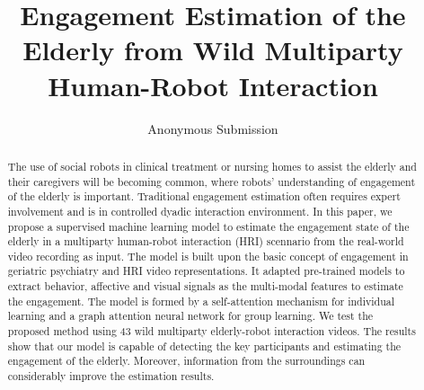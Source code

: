 \documentclass[twocolumn]{svjour3}
\begin{document}
\title{Engagement Estimation of the Elderly from Wild Multiparty Human-Robot Interaction}
\subtitle{}
\author{Anonymous Submission}
\date{}                                   %
\maketitle

\begin{abstract}
The use of social robots in clinical treatment or nursing homes to assist the elderly and their caregivers will be becoming common, where robots' understanding of engagement of the elderly is important. Traditional engagement estimation often requires expert involvement and is in controlled dyadic interaction environment. In this paper, we propose a supervised machine learning model to estimate the engagement state of the elderly in a multiparty human-robot interaction (HRI) scennario from the real-world video recording as input. The model is built upon the basic concept of engagement in geriatric psychiatry and HRI video representations. It adapted pre-trained models to extract behavior, affective and visual signals as the multi-modal features to estimate the engagement. The model is formed by a self-attention mechanism for individual learning and a graph attention neural network for group learning.  
We test the proposed method using 43 wild multiparty elderly-robot interaction videos.  The results show that our model is capable of detecting the key participants and estimating the engagement of the elderly. Moreover, information from the surroundings can considerably improve the estimation results.
\end{abstract}
\end{document}
